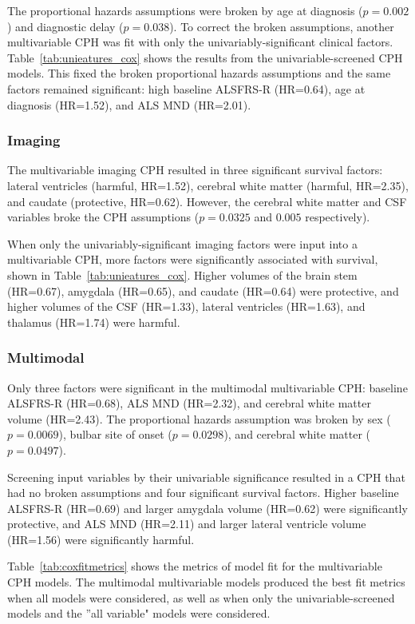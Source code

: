 The proportional hazards assumptions were broken by age at diagnosis ($p=0.002$) and diagnostic delay ($p=0.038$).
To correct the broken assumptions, another multivariable CPH was fit with only the univariably-significant clinical factors.
Table~\ref{tab:unieatures_cox} shows the results from the univariable-screened CPH models.
This fixed the broken proportional hazards assumptions and the same factors remained significant: high baseline ALSFRS-R (HR=0.64), age at diagnosis (HR=1.52), and ALS MND (HR=2.01).


\subsubsection{Imaging}
The multivariable imaging CPH resulted in three significant survival factors: lateral ventricles (harmful, HR=1.52), cerebral white matter (harmful, HR=2.35), and caudate (protective, HR=0.62).
However, the cerebral white matter and CSF variables broke the CPH assumptions ($p=0.0325$ and $0.005$ respectively).

When only the univariably-significant imaging factors were input into a multivariable CPH, more factors were significantly associated with survival, shown in Table~\ref{tab:unieatures_cox}.
Higher volumes of the brain stem (HR=0.67), amygdala (HR=0.65), and caudate (HR=0.64) were protective, and higher volumes of the CSF (HR=1.33), lateral ventricles (HR=1.63), and thalamus (HR=1.74) were harmful.

\subsubsection{Multimodal}
Only three factors were significant in the multimodal multivariable CPH: baseline ALSFRS-R (HR=0.68), ALS MND (HR=2.32), and cerebral white matter volume (HR=2.43).
The proportional hazards assumption was broken by sex ($p=0.0069$), bulbar site of onset ($p=0.0298$), and cerebral white matter ($p=0.0497$).

Screening input variables by their univariable significance resulted in a CPH that had no broken assumptions and four significant survival factors.
Higher baseline ALSFRS-R (HR=0.69) and larger amygdala volume (HR=0.62) were significantly protective, and ALS MND (HR=2.11) and larger lateral ventricle volume (HR=1.56) were significantly harmful.

Table~\ref{tab:coxfitmetrics} shows the metrics of model fit for the multivariable CPH models.
The multimodal multivariable models produced the best fit metrics when all models were considered, as well as when only the univariable-screened models and the ''all variable" models were considered.

